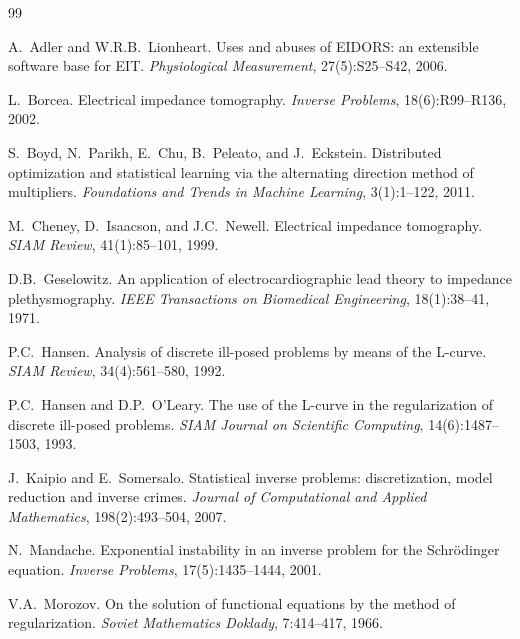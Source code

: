 \documentclass[11pt,a4paper]{article}
\begin{document}
\begin{thebibliography}{99}

A.~Adler and W.R.B.~Lionheart.
\newblock Uses and abuses of EIDORS: an extensible software base for EIT.
\newblock \emph{Physiological Measurement}, 27(5):S25--S42, 2006.

L.~Borcea.
\newblock Electrical impedance tomography.
\newblock \emph{Inverse Problems}, 18(6):R99--R136, 2002.

S.~Boyd, N.~Parikh, E.~Chu, B.~Peleato, and J.~Eckstein.
\newblock Distributed optimization and statistical learning via the
  alternating direction method of multipliers.
\newblock \emph{Foundations and Trends in Machine Learning}, 3(1):1--122,
  2011.

M.~Cheney, D.~Isaacson, and J.C.~Newell.
\newblock Electrical impedance tomography.
\newblock \emph{SIAM Review}, 41(1):85--101, 1999.

D.B.~Geselowitz.
\newblock An application of electrocardiographic lead theory to impedance
  plethysmography.
\newblock \emph{IEEE Transactions on Biomedical Engineering}, 18(1):38--41,
  1971.

P.C.~Hansen.
\newblock Analysis of discrete ill-posed problems by means of the L-curve.
\newblock \emph{SIAM Review}, 34(4):561--580, 1992.

P.C.~Hansen and D.P.~O'Leary.
\newblock The use of the L-curve in the regularization of discrete ill-posed
  problems.
\newblock \emph{SIAM Journal on Scientific Computing}, 14(6):1487--1503,
  1993.

J.~Kaipio and E.~Somersalo.
\newblock Statistical inverse problems: discretization, model reduction and
  inverse crimes.
\newblock \emph{Journal of Computational and Applied Mathematics},
  198(2):493--504, 2007.

N.~Mandache.
\newblock Exponential instability in an inverse problem for the
  Schr\"odinger equation.
\newblock \emph{Inverse Problems}, 17(5):1435--1444, 2001.

V.A.~Morozov.
\newblock On the solution of functional equations by the method of
  regularization.
\newblock \emph{Soviet Mathematics Doklady}, 7:414--417, 1966.


\end{thebibliography}
\end{document}
